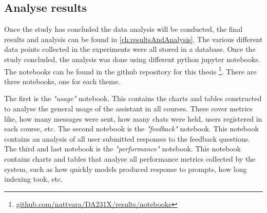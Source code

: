 \subsection{Analyse results}


Once the study has concluded the data analysis will be conducted, the final results and analysis can be found in \autoref{ch:resultsAndAnalysis}. The various different data points collected in the experiments were all stored in a database. Once the study concluded, the analysis was done using different python jupyter notebooks. The notebooks can be found in the github repository for this thesis \footnote{\href{https://github.com/nattvara/DA231X/tree/main/results/notebooks}{github.com/nattvara/DA231X/results/notebooks}}. There are three notebooks, one for each theme.


The first is the \textit{"usage"} notebook. This contains the charts and tables constructed to analyse the general usage of the assistant in all courses. These cover metrics like, how many messages were sent, how many chats were held, users registered in each course, etc. The second notebook is the \textit{"feedback"} notebook. This notebook contains an analysis of all user submitted responses to the feedback questions. The third and last notebook is the \textit{"performance"} notebook. This notebook contains charts and tables that analyse all performance metrics collected by the system, such as how quickly models produced response to prompts, how long indexing took, etc.














